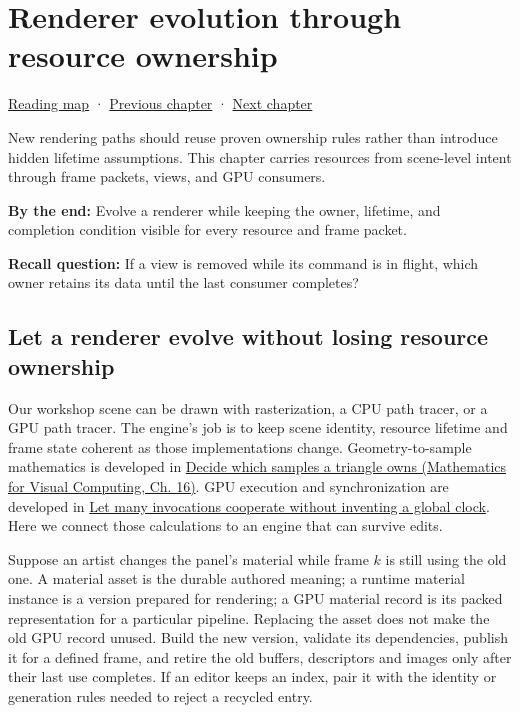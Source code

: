 \chapter{Renderer evolution through resource ownership}\label{06-engine-ii-ch025-renderer-evolution-through-resource-ownership}\hypertarget{06-engine-ii-ch025}{}\label{stagechapter:06-engine-ii-ch025}

\hyperref[volume-reading-map]{Reading map} · \hyperref[05-engine-i-ch024-profiling-and-languageplatform-ownership]{Previous chapter} · \hyperref[06-engine-ii-ch026-descriptor-arrays-and-backend-limits]{Next chapter}

New rendering paths should reuse proven ownership rules rather than introduce hidden lifetime assumptions. This chapter carries resources from scene-level intent through frame packets, views, and GPU consumers.

\textbf{By the end:} Evolve a renderer while keeping the owner, lifetime, and completion condition visible for every resource and frame packet.

\textbf{Recall question:} If a view is removed while its command is in flight, which owner retains its data until the last consumer completes?

\section{Let a renderer evolve without losing resource ownership}\label{06-engine-ii-ch025-let-a-renderer-evolve-without-losing-resource-ownership}

Our workshop scene can be drawn with rasterization, a CPU path tracer, or a GPU path tracer. The engine's job is to keep scene identity, resource lifetime and frame state coherent as those implementations change. Geometry-to-sample mathematics is developed in \href{../02-Mathematics-for-Visual-Computing/main.pdf\#nameddest=03-visual-computing-i-ch012-decide-which-samples-a-triangle-owns}{Decide which samples a triangle owns (Mathematics for Visual Computing, Ch. 16)}. GPU execution and synchronization are developed in \hyperref[01-foundations-i-ch008-let-many-invocations-cooperate-without-inventing-a-global-clock]{Let many invocations cooperate without inventing a global clock}. Here we connect those calculations to an engine that can survive edits.

Suppose an artist changes the panel's material while frame \(k\) is still using the old one. A material asset is the durable authored meaning; a runtime material instance is a version prepared for rendering; a GPU material record is its packed representation for a particular pipeline. Replacing the asset does not make the old GPU record unused. Build the new version, validate its dependencies, publish it for a defined frame, and retire the old buffers, descriptors and images only after their last use completes. If an editor keeps an index, pair it with the identity or generation rules needed to reject a recycled entry.

